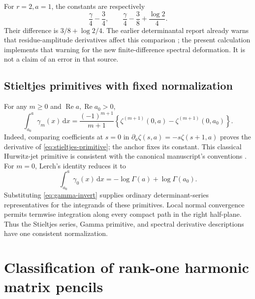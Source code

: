 \documentclass[11pt,letterpaper]{article}
\numberwithin{equation}{section}
\theoremstyle{definition}\newtheorem{definition}[theorem]{Definition}
\theoremstyle{remark}\newtheorem{remark}[theorem]{Remark}
\DeclareMathOperator{\Rea}{Re}
\newcommand{\dd}{\,\mathrm d}
\begin{document}
For $r=2,a=1$, the constants are respectively
\begin{equation}\label{eq:cutoff-example}
 \frac\gamma4-\frac34,
 \qquad
 \frac\gamma4-\frac38+\frac{\log2}{4}.
\end{equation}
Their difference is $3/8+\log2/4$. The earlier determinantal report
already warns that residue-amplitude derivatives affect this comparison
\cite{repo:dhr}; the present calculation implements that warning for the
new finite-difference spectral deformation. It is not a claim of an error
in that source.

\subsection{Stieltjes primitives with fixed normalization}
For any $m\ge0$ and $\Rea a,\Rea a_0>0$,
\begin{equation}\label{eq:stieltjes-primitive}
 \int_{a_0}^a\gamma_m(x)\dd x
 =\frac{(-1)^{m+1}}{m+1}
    \left\{\zeta^{(m+1)}(0,a)-\zeta^{(m+1)}(0,a_0)\right\}.
\end{equation}
Indeed, comparing coefficients at $s=0$ in
$\partial_a\zeta(s,a)=-s\zeta(s+1,a)$ proves the derivative of
\eqref{eq:stieltjes-primitive}; the anchor fixes its constant. This
classical Hurwitz-jet primitive is consistent with the canonical
manuscript's conventions \cite{repo:integration,dlmf:hurwitz}.
For $m=0$, Lerch's identity reduces it to
\[
 \int_{a_0}^a\gamma_0(x)\dd x=-\log\Gamma(a)+\log\Gamma(a_0).
\]
Substituting \eqref{eq:gamma-invert} supplies ordinary determinant-series
representatives for the integrands of these primitives. Local normal
convergence permits termwise integration along every compact path in
the right half-plane. Thus the Stieltjes series, Gamma primitive, and
spectral derivative descriptions have one consistent normalization.

\section{Classification of rank-one harmonic matrix pencils}
\label{sec:classification}
\end{document}
